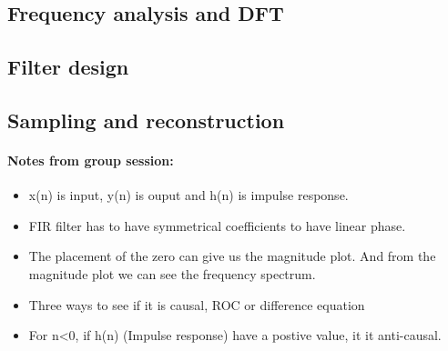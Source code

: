 \documentclass{article}
\begin{document}
\subsection{Frequency analysis and DFT}

\subsection{Filter design}

\subsection{Sampling and reconstruction}

\paragraph{Notes from group session:}
\begin{itemize}
    \item x(n) is input, y(n) is ouput and h(n) is impulse response. 
    \item FIR filter has to have symmetrical coefficients to have linear phase.
    \item The placement of the zero can give us the magnitude plot. And from the magnitude plot we can see the frequency spectrum. 
    \item Three ways to see if it is causal, ROC or difference equation
    \item For n<0, if h(n) (Impulse response) have a postive value, it it anti-causal.
\end{itemize}
\end{document}
